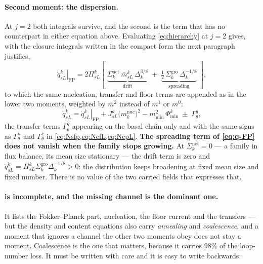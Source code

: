 \documentclass{article}
\begin{document}
\paragraph{Second moment: the dispersion.} At $j=2$ both integrals survive, and
the second is the term that has no counterpart in either equation above.
Evaluating \cref{eq:hierarchy} at $j=2$ gives, with the closure integrals
written in the compact form the next paragraph justifies,
\begin{equation}
  \left.\dot q^k_{sL}\right|_{\mathrm{FP}}
  =2\Pi^k_{sL}
    \left[\;\underbrace{\Sigma^{\mathrm{net}}_k\,\bar m^k_{sL}\,\Delta_k^{3/8}}
              _{\text{drift}}
      \;+\;\underbrace{\tfrac12\,\Sigma^{\mathrm{gro}}_k\,\Delta_k^{-1/8}}
              _{\text{spreading}}\;\right],
  \label{eq:q-FP}
\end{equation}
to which the same nucleation, transfer and floor terms are appended as in the
lower two moments, weighted by $m^2$ instead of $m^1$ or $m^0$:
\begin{equation}
  \dot q^k_{sL}=\left.\dot q^k_{sL}\right|_{\mathrm{FP}}
    +J^k_{sL}\bigl(m^{\mathrm{nuc}}_k\bigr)^{2}
    -m_{\min}^{2}\,\Phi^k_{\min}
    \;\pm\;\Gamma^{q}_{\theta},
  \label{eq:qdot}
\end{equation}
the transfer terms $\Gamma^q_\theta$ appearing on the basal chain only and with
the same signs as $\Gamma^n_\theta$ and $\Gamma^c_\theta$ in
\cref{eq:Nsfp,eq:NcfL,eq:NcpL}. \textbf{The spreading term of \cref{eq:q-FP} does
not vanish when the family stops growing.} At $\Sigma^{\mathrm{net}}_k=0$ --- a
family in flux balance, its mean size stationary --- the drift term is zero and
$\dot q^k_{sL}=\Pi^k_{sL}\Sigma^{\mathrm{gro}}_k\Delta_k^{-1/8}>0$: the
distribution keeps broadening at fixed mean size and fixed number. There is no
value of the two carried fields that expresses that.

\paragraph{ is incomplete, and the missing channel is the
dominant one.} It lists the Fokker--Planck part, nucleation, the floor current
and the transfers --- but the density and content equations also carry
\emph{annealing} and \emph{coalescence}, and a moment that ignores a channel the
other two moments obey does not stay a moment. Coalescence is the one that
matters, because it carries $98\%$ of the loop-number loss. It must be written
with care and it is easy to write backwards:
\end{document}

